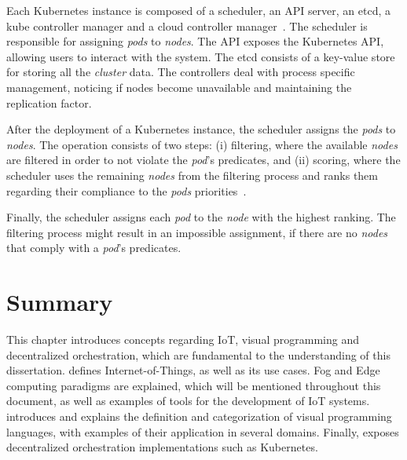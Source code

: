 Each Kubernetes instance is composed of a scheduler, an API server, an etcd, a kube controller manager and a cloud controller manager~\cite{kubernetes_components}. The scheduler is responsible for assigning \textit{pods} to \textit{nodes}. The API exposes the Kubernetes API, allowing users to interact with the system. The etcd consists of a key-value store for storing all the \textit{cluster} data. The controllers deal with process specific management, \ie noticing if nodes become unavailable and maintaining the replication factor.

After the deployment of a Kubernetes instance, the scheduler assigns the \textit{pods} to \textit{nodes}. The operation consists of two steps: (i) filtering, where the available \textit{nodes} are filtered in order to not violate the \textit{pod}'s predicates, and (ii) scoring, where the scheduler uses the remaining \textit{nodes} from the filtering process and ranks them regarding their compliance to the \textit{pods} priorities~\cite{kubernetes_scheduler}. 

Finally, the scheduler assigns each \textit{pod} to the \textit{node} with the highest ranking. The filtering process might result in an impossible assignment, if there are no \textit{nodes} that comply with a \textit{pod}'s predicates. 

\section{Summary}

This chapter introduces concepts regarding IoT, visual programming and decentralized orchestration, which are fundamental to the understanding of this dissertation.  defines Internet-of-Things, as well as its use cases. Fog and Edge computing paradigms are explained, which will be mentioned throughout this document, as well as examples of tools for the development of IoT systems.  introduces and explains the definition and categorization of visual programming languages, with examples of their application in several domains. Finally,  exposes decentralized orchestration implementations such as Kubernetes.
